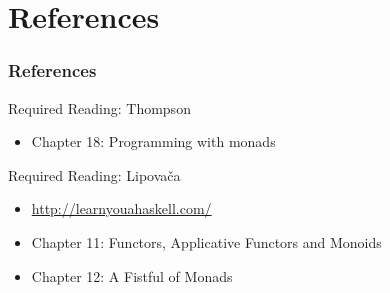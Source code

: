 \documentclass[dvipsnames]{beamer}
\theoremstyle{plain}
\begin{document}
\section*{References}

\begin{frame}
  \frametitle{References}

  \begin{block}{Required Reading: Thompson}
    \begin{itemize}
      \item Chapter 18: \alert{Programming with monads}
    \end{itemize}
  \end{block}

  \begin{block}{Required Reading: Lipovača}
    \begin{itemize}
      \item \url{http://learnyouahaskell.com/}
      \item Chapter 11: \alert{Functors, Applicative Functors and Monoids}
      \item Chapter 12: \alert{A Fistful of Monads}
    \end{itemize}
  \end{block}
\end{frame}
\end{document}
